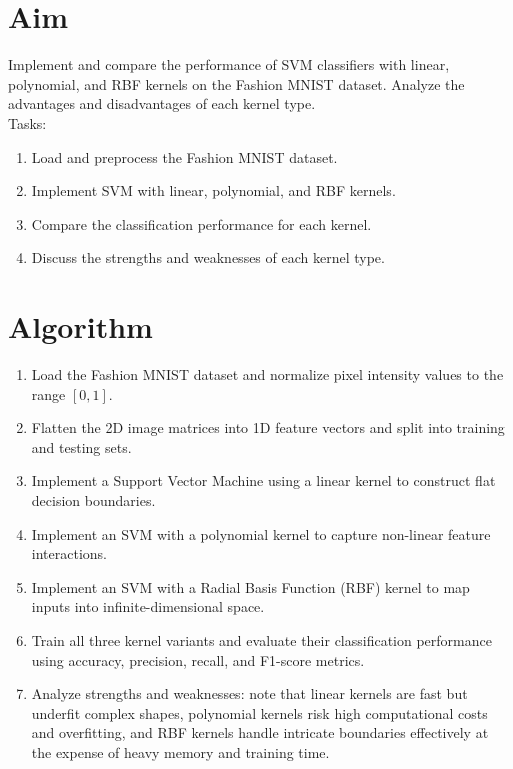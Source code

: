 \documentclass[12pt, a4paper]{report}
\begin{document}
\section*{Aim} 
Implement and compare the performance of SVM classifiers with linear, polynomial, and RBF kernels on the
Fashion MNIST dataset. Analyze the advantages and disadvantages of
each kernel type. \\
Tasks:
\begin{enumerate}[\quad -]
	\itemsep 0em 
	
	\item Load and preprocess the Fashion MNIST dataset.
	\item Implement SVM with linear, polynomial, and RBF kernels.
	\item Compare the classification performance for each kernel.
	\item Discuss the strengths and weaknesses of each kernel type.
	
\end{enumerate}


\section*{Algorithm} 
\begin{enumerate}
	\item Load the Fashion MNIST dataset and normalize pixel intensity values to the range $[0, 1]$.
	\item Flatten the 2D image matrices into 1D feature vectors and split into training and testing sets.
	\item Implement a Support Vector Machine using a linear kernel to construct flat decision boundaries.
	\item Implement an SVM with a polynomial kernel to capture non-linear feature interactions.
	\item Implement an SVM with a Radial Basis Function (RBF) kernel to map inputs into infinite-dimensional space.
	\item Train all three kernel variants and evaluate their classification performance using accuracy, precision, recall, and F1-score metrics.
	\item Analyze strengths and weaknesses: note that linear kernels are fast but underfit complex shapes, polynomial kernels risk high computational costs and overfitting, and RBF kernels handle intricate boundaries effectively at the expense of heavy memory and training time.
\end{enumerate}
\end{document}
